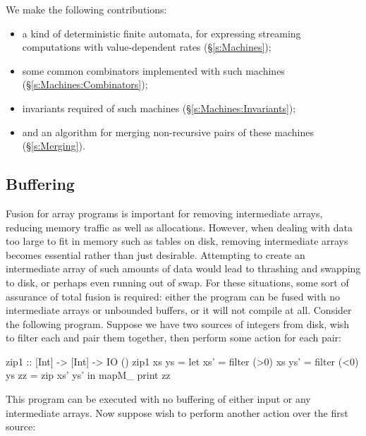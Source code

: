 

We make the following contributions:
\begin{itemize}
\item a kind of deterministic finite automata, for expressing streaming computations with value-dependent rates (\S\ref{s:Machines});
\item some common combinators implemented with such machines (\S\ref{s:Machines:Combinators});
\item invariants required of such machines (\S\ref{s:Machines:Invariants});
\item and an algorithm for merging non-recursive pairs of these machines (\S\ref{s:Merging}).
\end{itemize}


\subsection{Buffering}

Fusion for array programs is important for removing intermediate arrays, reducing memory traffic as well as allocations.
However, when dealing with data too large to fit in memory such as tables on disk, removing intermediate arrays becomes essential rather than just desirable.
Attempting to create an intermediate array of such amounts of data would lead to thrashing and swapping to disk, or perhaps even running out of swap.
For these situations, some sort of assurance of total fusion is required: either the program can be fused with no intermediate arrays or unbounded buffers, or it will not compile at all.
Consider the following program.
Suppose we have two sources of integers from disk, wish to filter each and pair them together, then perform some action for each pair:

\begin{code}
zip1 :: [Int] -> [Int] -> IO ()
zip1 xs ys
 = let xs'  = filter (>0) xs
       ys'  = filter (<0) ys
       zz   = zip xs' ys'
   in  mapM_ print        zz
\end{code}

This program can be executed with no buffering of either input or any intermediate arrays.
Now suppose wish to perform another action over the first source:


